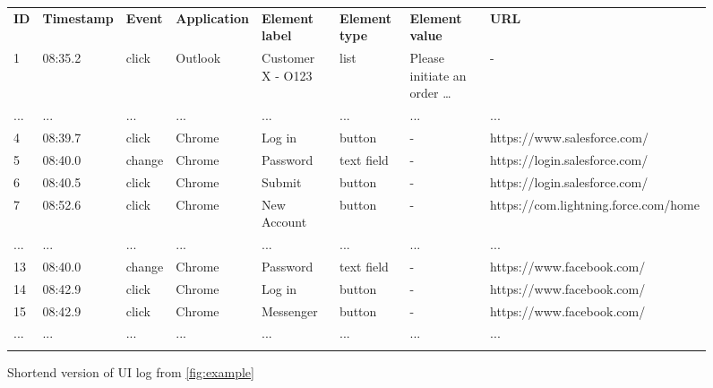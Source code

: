\begin{figure}[h!]
	\centering
	\begin{adjustbox}{max width=\textwidth}
		\begin{tabular}{llllllll}
			\hline\noalign{\smallskip}\noalign{\smallskip}
			\textbf{ID} &\textbf{Timestamp}&\textbf{Event}&\textbf{Application}&\textbf{Element label}&\textbf{Element type}&\textbf{Element value}&\textbf{URL}\\
			\noalign{\smallskip}\hline\noalign{\smallskip}
			1&08:35.2&click&Outlook&Customer X - O123&list&Please initiate an order …&-\\\noalign{\smallskip}
			...&...&...&...&...&...&...&...\\
			4&08:39.7&click&Chrome&Log in&button&-&https://www.salesforce.com/\\\noalign{\smallskip}
			5&08:40.0&change&Chrome&Password&text field&-&https://login.salesforce.com/\\\noalign{\smallskip}
			6&08:40.5&click&Chrome&Submit&button&-&https://login.salesforce.com/\\\noalign{\smallskip}
			7&08:52.6&click&Chrome&New Account&button&-&https://com.lightning.force.com/home\\\noalign{\smallskip}
			...&...&...&...&...&...&...&...\\
			13&08:40.0&change&Chrome&Password&text field&-&https://www.facebook.com/\\\noalign{\smallskip}
			14&08:42.9&click&Chrome&Log in&button&-&https://www.facebook.com/\\\noalign{\smallskip}
			15&08:42.9&click&Chrome&Messenger&button&-&https://www.facebook.com/\\\noalign{\smallskip}
			...&...&...&...&...&...&...&...\\
			\hline\noalign{\smallskip}
		\end{tabular}
	\end{adjustbox}
	\caption{Shortend version of UI log from \autoref{fig:example}}
	\label{fig:example_short}
\end{figure}

